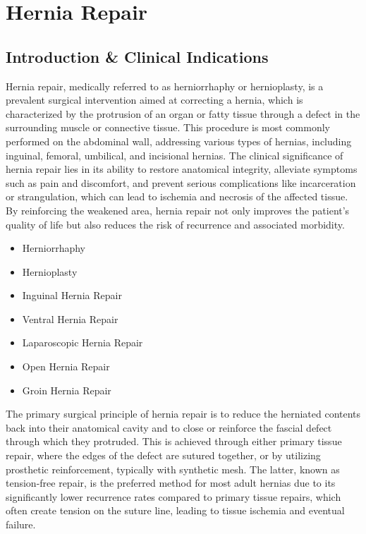 \chapter{Hernia Repair}

\section*{Introduction \& Clinical Indications}
Hernia repair, medically referred to as herniorrhaphy or hernioplasty, is a prevalent surgical intervention aimed at correcting a hernia, which is characterized by the protrusion of an organ or fatty tissue through a defect in the surrounding muscle or connective tissue. This procedure is most commonly performed on the abdominal wall, addressing various types of hernias, including inguinal, femoral, umbilical, and incisional hernias. The clinical significance of hernia repair lies in its ability to restore anatomical integrity, alleviate symptoms such as pain and discomfort, and prevent serious complications like incarceration or strangulation, which can lead to ischemia and necrosis of the affected tissue. By reinforcing the weakened area, hernia repair not only improves the patient's quality of life but also reduces the risk of recurrence and associated morbidity.

\begin{itemize}
  \item Herniorrhaphy
  \item Hernioplasty
  \item Inguinal Hernia Repair
  \item Ventral Hernia Repair
  \item Laparoscopic Hernia Repair
  \item Open Hernia Repair
  \item Groin Hernia Repair
\end{itemize}

The primary surgical principle of hernia repair is to reduce the herniated contents back into their anatomical cavity and to close or reinforce the fascial defect through which they protruded. This is achieved through either primary tissue repair, where the edges of the defect are sutured together, or by utilizing prosthetic reinforcement, typically with synthetic mesh. The latter, known as tension-free repair, is the preferred method for most adult hernias due to its significantly lower recurrence rates compared to primary tissue repairs, which often create tension on the suture line, leading to tissue ischemia and eventual failure.

